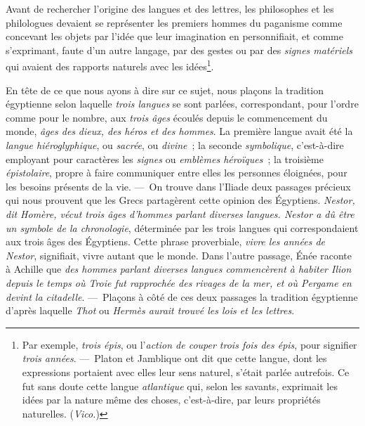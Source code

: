 \documentclass[french,twoside]{book} %
\begin{document}
Avant de rechercher l’origine des langues et des lettres, les philosophes et les philologues devaient se représenter les premiers hommes du paganisme comme concevant les objets par l’idée que leur imagination en personnifiait, et comme s’exprimant, faute d’un autre langage, par des gestes ou par des {\itshape signes matériels} qui avaient des rapports naturels avec les idées\footnote{Par exemple, {\itshape trois épis}, ou l’{\itshape action de couper trois fois des épis}, pour signifier {\itshape trois années}. — Platon et Jamblique ont dit que cette langue, dont les expressions portaient avec elles leur sens naturel, s’était parlée autrefois. Ce fut sans doute cette langue {\itshape atlantique} qui, selon les savants, exprimait les idées par la nature même des choses, c’est-à-dire, par leurs propriétés naturelles. ({\itshape Vico.})}.\par
En tête de ce que nous ayons à dire sur ce sujet, nous plaçons la tradition égyptienne selon laquelle {\itshape trois langues} se sont parlées, correspondant, pour l’ordre comme pour le nombre, aux {\itshape trois âges} écoulés depuis le commencement du monde, {\itshape âges des}  {\itshape dieux, des héros et des hommes}. La première langue avait été la {\itshape langue hiéroglyphique}, ou {\itshape sacrée}, ou {\itshape divine} ; la seconde {\itshape symbolique}, c’est-à-dire employant pour caractères les {\itshape signes} ou {\itshape emblèmes héroïques} ; la troisième {\itshape épistolaire}, propre à faire communiquer entre elles les personnes éloignées, pour les besoins présents de la vie. — On trouve dans l’Iliade deux passages précieux qui nous prouvent que les Grecs partagèrent cette opinion des Égyptiens. \emph{{\itshape Nestor}, dit Homère, {\itshape  vécut trois âges d’hommes parlant diverses langues. Nestor a dû être un symbole de la chronologie}}, déterminée par les trois langues qui correspondaient aux trois âges des Égyptiens. Cette phrase proverbiale, {\itshape vivre les années de Nestor}, signifiait, vivre autant que le monde. Dans l’autre passage, Énée raconte à Achille que \emph{{\itshape des hommes parlant diverses langues commencèrent à habiter Ilion depuis le temps où Troie fut rapprochée des rivages de la mer, et où Pergame en devint la citadelle}}. — Plaçons à côté de ces deux passages la tradition égyptienne d’après laquelle {\itshape Thot} ou {\itshape Hermès aurait trouvé les lois et les lettres}.\par
\end{document}
